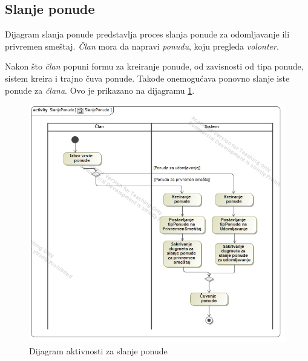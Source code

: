 \subsection{Slanje ponude}
\par Dijagram slanja ponude predstavlja proces slanja ponude za odomljavanje ili privremen smeštaj. \textit{Član} mora da napravi \textit{ponudu}, koju pregleda \textit{volonter}.
\par Nakon što \textit{član} popuni formu za kreiranje ponude, od zavisnosti od tipa ponude, sistem kreira i trajno čuva ponude. Takođe onemogućava ponovno slanje
iste ponude za \textit{člana}. Ovo je prikazano na dijagramu \ref{fig:activity-send-offer}.
\begin{figure}[ht]
    \centering
    \includegraphics[width=\textwidth, height=\textwidth]{img/send_offer.jpg}
    \caption{Dijagram aktivnosti za slanje ponude}
    \label{fig:activity-send-offer}
\end{figure}
